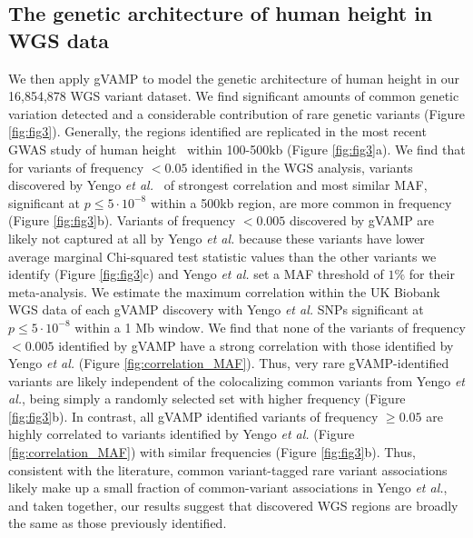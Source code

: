 \subsection{The genetic architecture of human height in WGS data}
We then apply gVAMP to model the genetic architecture of human height in our 16,854,878 WGS variant dataset. We find significant amounts of common genetic variation detected and a considerable contribution of rare genetic variants (Figure \ref{fig:fig3}). Generally, the regions identified are replicated in the most recent GWAS study of human height~\cite{HTbig} within 100-500kb (Figure \ref{fig:fig3}a). We find that for variants of frequency $<0.05$ identified in the WGS analysis, variants discovered by Yengo \textit{et al.}~\cite{HTbig} of strongest correlation and most similar MAF, significant at $p\le5 \cdot 10^{-8}$ within a 500kb region, are more common in frequency (Figure \ref{fig:fig3}b).  Variants of frequency $<0.005$ discovered by gVAMP are likely not captured at all by Yengo \textit{et al.} because these variants have lower average marginal Chi-squared test statistic values than the other variants we identify (Figure \ref{fig:fig3}c) and Yengo \textit{et al.} set a MAF threshold of $1\%$ for their meta-analysis. We estimate the maximum correlation within the UK Biobank WGS data of each gVAMP discovery with Yengo \emph{et al.} SNPs significant at $p\le5 \cdot 10^{-8}$ within a 1 Mb window. We find that none of the variants of frequency $<0.005$ identified by gVAMP have a strong correlation with those identified by Yengo \textit{et al.} (Figure \ref{fig:correlation_MAF}). Thus, very rare gVAMP-identified variants are likely independent of the colocalizing common variants from Yengo \textit{et al.}, being simply a randomly selected set with higher frequency (Figure \ref{fig:fig3}b). In contrast, all gVAMP identified variants of frequency $\geq0.05$ are highly correlated to variants identified by Yengo \textit{et al.} (Figure \ref{fig:correlation_MAF}) with similar frequencies (Figure \ref{fig:fig3}b). Thus, consistent with the literature\cite{Wray.pbio}, common variant-tagged rare variant associations likely make up a small fraction of common-variant associations in Yengo \emph{et al.}, and taken together, our results suggest that discovered WGS regions are broadly the same as those previously identified.


